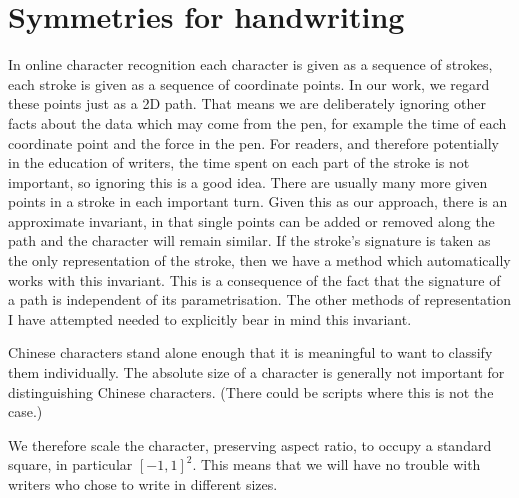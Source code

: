 \section{Symmetries for handwriting}
In online character recognition each character is given as a sequence of strokes, each stroke is given as a sequence of coordinate points. In our work, we regard these points just as a 2D path.
That means we are deliberately ignoring other facts about the data which may come from the pen, for example the time of each coordinate point and the force in the pen.
For readers, and therefore potentially in the education of writers, the time spent on each part of the stroke is not important, so ignoring this is a good idea.
There are usually many more given points in a stroke in each important turn.
Given this as our approach, there is an approximate invariant, in that single points can be added or removed along the path and the character will remain similar.
If the stroke's signature is taken as the only representation of the stroke, then we have a method which automatically works with this invariant. This is a consequence of the fact that the signature of a path is independent of its parametrisation.
The other methods of representation I have attempted needed to explicitly bear in mind this invariant.

Chinese characters stand alone enough that it is meaningful to want to classify them individually.
The absolute size of a character is generally not important for distinguishing Chinese characters. 
(There could be scripts where this is not the case.)
\iffalse
\begin{tikzpicture}
\begin{scope}[scale=0.015,yscale=-1]
  \filldraw svg{m136,549c-10.9-4.33-11.9-16.2-9.83-28.4,2.53-14.7,7.93-26.7,9.68-42,4.91-42.8,18.9-94.2,5.15-136,0-13.6-0.934-32,10.4-41.2,22.2-5.69,22.6-2.65,24.9,11.7,2.18,13.7,1.91,28.6,2.6,42.5-2.89,37.6-8.06,73.6-13.6,111-1.88,12.7-4.89,25.1-6.42,37.7-2.65,22,1.65,45-22.9,45z};
  \filldraw svg{m294.9,781c-12.8-6.42-18.7-20.8-20.8-34.3-0.548-3.39,0.711-4.58,3.54-11.4,6.85-16.6,6.53-26.5,13.1-47.6,4.94-16.5,9.12-45.5,13.3-77.1,8.38-64.1,17.1-116,29.4-179,4.92-25.3,9.13-54.5,6.58-60.7,0-19.6,3.55-51.8,23.6-61.8,7.92-3.95,8.68-1.7,11.9,5.97,1.33,3.17,2.41,6.57,3.67,9.76,0,18.9-3.06,37.9-6.59,56.9-4.74,25.6-8.99,50.7-14.5,76.1-17.1,79-21.6,149-39.6,229-3.72,16.4-9.65,30.5-9.59,47.2,0.0707,17.8-0.989,47.6-14,47.6z};
\filldraw svg{m541,387c-9-10-5-24-2-37 2-8 3-14 5-22 3-11 4-15 14-16 8-1 10-1 16,4 16,15 5,22-1,38-2,6-3,11-6,17-4,7-8,14-14,17-5,3-8,3-12-1z};
\end{scope}
\end{tikzpicture}
\fi
We therefore scale the character, preserving aspect ratio, to occupy a standard square, in particular $[-1,1]^2$.
This means that we will have no trouble with writers who chose to write in different sizes.

